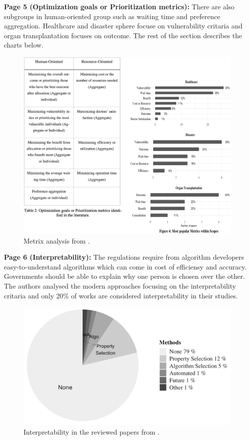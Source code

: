     \textbf{Page 5 (Optimization goals or Prioritization metrics):}
    There are also subgroups in human-oriented group such as waiting time and preference aggregation. Healthcare and disaster sphere focuse on vulnerability critaria and organ transplantation focuses on outcome. The rest of the section describes the charts below. 
    \begin{figure}[H]
        \centering
        \includegraphics[width=1\textwidth]{figures/0017_AR01GB23/fig4.png}
        \caption{Metrix analysis from \cite{x121}.}
        \label{fig4:0017_AR01GB23}
    \end{figure}
    
    \textbf{Page 6 (Interpretability):}
    The regulations require from algorithm developers easy-to-understand algorithms which can come in cost of efficiensy and accuracy. Governments should be able to explain why one person is chosen over the other. The authors analysed the modern approaches focusing on the interpretability critaria and only 20\% of works are considered interpretability in their studies.
    \begin{figure}[H]
        \centering
        \includegraphics[width=.7\textwidth]{figures/0017_AR01GB23/fig5.png}
        \caption{Interpretability in the reviewed papers from \cite{x121}.}
        \label{fig5:0017_AR01GB23}
    \end{figure} 
    
